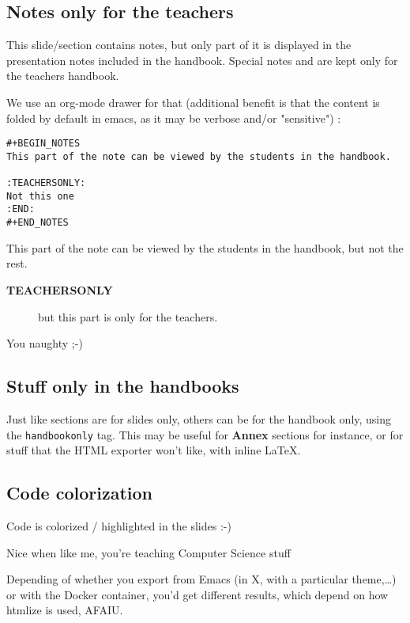 \documentclass[a4paper]{article}
\newenvironment{NOTES}{\begin{lrbox}{\mybox}\begin{minipage}{0.9\textwidth}\begin{shaded}}{\end{shaded}\end{minipage}\end{lrbox}\fbox{\usebox{\mybox}}}
\begin{document}
\subsection{Notes only for the teachers}
\label{sec:org0b84c9b}

This slide/section contains notes, but only part of it is displayed in
the presentation notes included in the handbook. Special notes and are
kept only for the teachers handbook.

We use an org-mode drawer for that (additional benefit is that the content is folded by default in emacs, as it may be verbose and/or "sensitive") :
\begin{verbatim}
#+BEGIN_NOTES
This part of the note can be viewed by the students in the handbook.

:TEACHERSONLY:
Not this one
:END:
#+END_NOTES
\end{verbatim}

\begin{NOTES}


This part of the note can be viewed by the students in the handbook,
but not the rest.

\begin{description}
\item[{\textbf{TEACHERSONLY}}] but this part is only for the teachers.
\end{description}

You naughty ;-)
\end{NOTES}

\subsection{Stuff only in the handbooks}
\label{sec:orgdbfd653}

Just like sections are for slides only, others can be for the handbook
only, using the \texttt{handbookonly} tag. This may be useful for \textbf{Annex}
sections for instance, or for stuff that the HTML exporter won't like, with inline \LaTeX{}.

\subsection{Code colorization}
\label{sec:org894a5a3}
Code is colorized / highlighted in the slides :-)

\begin{NOTES}
Nice when like me, you're teaching Computer Science stuff

Depending of whether you export from Emacs (in X, with a particular
theme,\ldots{}) or with the Docker container, you'd get different results,
which depend on how htmlize is used, AFAIU.
\end{NOTES}
\end{document}
